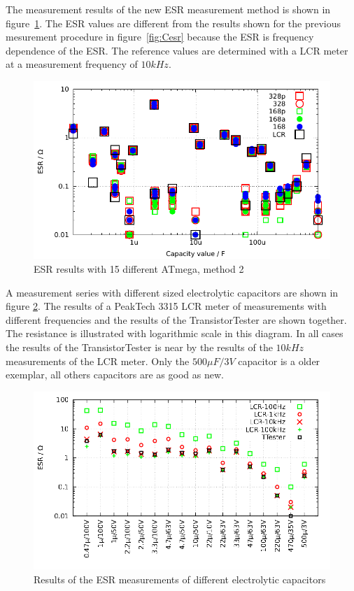 The measurement results of the new ESR measurement method is shown in figure~\ref{fig:Cesr2}.
The ESR values are different from the results shown for the previous mesurement procedure in figure~\ref{fig:Cesr} because 
the ESR is frequency dependence of the ESR.
The reference values are determined with a LCR meter at a measurement frequency of \(10kHz \).

\begin{figure}[H]
\centering
\includegraphics[width=16cm]{../GNU/Cesr2.pdf}
\caption{ESR results with 15 different ATmega, method 2}
\label{fig:Cesr2}
\end{figure}

A measurement series with different sized electrolytic capacitors are shown in figure \ref{fig:ElcoESR}.
The results of a PeakTech 3315 LCR meter of measurements with different frequencies and the results of the
TransistorTester are shown together. The resistance is illustrated with logarithmic scale in this diagram. 
In all cases the results of the TransistorTester is near by the results of
the \(10kHz\) measurements of the LCR meter.
Only the \(500\mu F/3V\) capacitor is a older exemplar, all others capacitors are as good as new.

\begin{figure}[H]
\centering
\includegraphics[width=18cm]{../GNU/Elco_esr.pdf}
\caption{Results of the ESR measurements of different electrolytic capacitors}
\label{fig:ElcoESR}
\end{figure}


